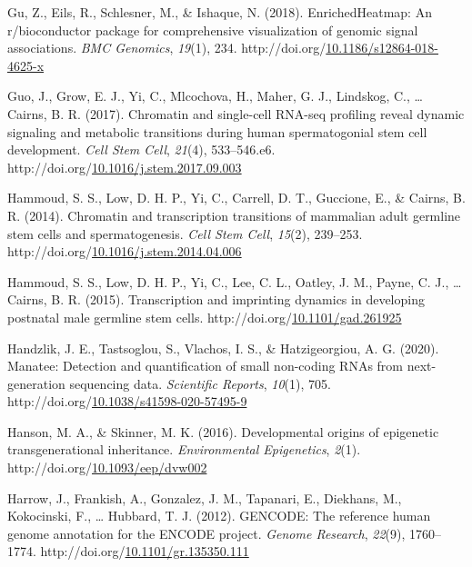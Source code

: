 \documentclass[12pt,twoside]{reedthesis}
\newlength{\cslhangindent}
\newenvironment{CSLReferences}[2] %
 {%
  \setlength{\parindent}{0pt}
  \ifodd #1 \everypar{\setlength{\hangindent}{\cslhangindent}}\ignorespaces\fi
  \ifnum #2 > 0
  \setlength{\parskip}{#2\baselineskip}
  \fi
 }%
 {}
\begin{document}
\begin{CSLReferences}{1}{0}
\leavevmode{}%
Gu, Z., Eils, R., Schlesner, M., \& Ishaque, N. (2018). EnrichedHeatmap: An r/bioconductor package for comprehensive visualization of genomic signal associations. \emph{BMC Genomics}, \emph{19}(1), 234. http://doi.org/\href{https://doi.org/10.1186/s12864-018-4625-x}{10.1186/s12864-018-4625-x}

\leavevmode{}%
Guo, J., Grow, E. J., Yi, C., Mlcochova, H., Maher, G. J., Lindskog, C., \ldots{} Cairns, B. R. (2017). Chromatin and single-cell RNA-seq profiling reveal dynamic signaling and metabolic transitions during human spermatogonial stem cell development. \emph{Cell Stem Cell}, \emph{21}(4), 533--546.e6. http://doi.org/\href{https://doi.org/10.1016/j.stem.2017.09.003}{10.1016/j.stem.2017.09.003}

\leavevmode{}%
Hammoud, S. S., Low, D. H. P., Yi, C., Carrell, D. T., Guccione, E., \& Cairns, B. R. (2014). Chromatin and transcription transitions of mammalian adult germline stem cells and spermatogenesis. \emph{Cell Stem Cell}, \emph{15}(2), 239--253. http://doi.org/\href{https://doi.org/10.1016/j.stem.2014.04.006}{10.1016/j.stem.2014.04.006}

\leavevmode{}%
Hammoud, S. S., Low, D. H. P., Yi, C., Lee, C. L., Oatley, J. M., Payne, C. J., \ldots{} Cairns, B. R. (2015). Transcription and imprinting dynamics in developing postnatal male germline stem cells. http://doi.org/\href{https://doi.org/10.1101/gad.261925}{10.1101/gad.261925}

\leavevmode{}%
Handzlik, J. E., Tastsoglou, S., Vlachos, I. S., \& Hatzigeorgiou, A. G. (2020). Manatee: Detection and quantification of small non-coding RNAs from next-generation sequencing data. \emph{Scientific Reports}, \emph{10}(1), 705. http://doi.org/\href{https://doi.org/10.1038/s41598-020-57495-9}{10.1038/s41598-020-57495-9}

\leavevmode{}%
Hanson, M. A., \& Skinner, M. K. (2016). Developmental origins of epigenetic transgenerational inheritance. \emph{Environmental Epigenetics}, \emph{2}(1). http://doi.org/\href{https://doi.org/10.1093/eep/dvw002}{10.1093/eep/dvw002}

\leavevmode{}%
Harrow, J., Frankish, A., Gonzalez, J. M., Tapanari, E., Diekhans, M., Kokocinski, F., \ldots{} Hubbard, T. J. (2012). GENCODE: The reference human genome annotation for the ENCODE project. \emph{Genome Research}, \emph{22}(9), 1760--1774. http://doi.org/\href{https://doi.org/10.1101/gr.135350.111}{10.1101/gr.135350.111}


\end{CSLReferences}
\end{document}
